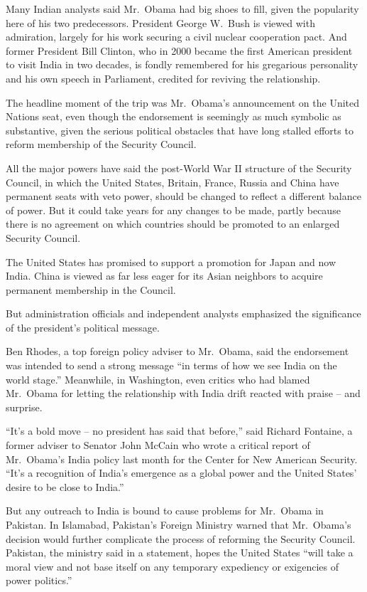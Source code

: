 ﻿\documentclass[12pt]{article}
\begin{document}
Many Indian analysts said Mr.~Obama had big shoes to fill, given the popularity here of his two
predecessors. President George W.~Bush is viewed with admiration, largely for his work securing a
civil nuclear cooperation pact. And former President Bill Clinton, who in 2000 became the first
American president to visit India in two decades, is fondly remembered for his gregarious
personality and his own speech in Parliament, credited for reviving the relationship.

The headline moment of the trip was Mr.~Obama's announcement on the United Nations seat, even though
the endorsement is seemingly as much symbolic as substantive, given the serious political obstacles
that have long stalled efforts to reform membership of the Security Council.

All the major powers have said the post-World War II structure of the Security Council, in which the
United States, Britain, France, Russia and China have permanent seats with veto power, should be
changed to reflect a different balance of power. But it could take years for any changes to be made,
partly because there is no agreement on which countries should be promoted to an enlarged Security
Council.

The United States has promised to support a promotion for Japan and now India. China is viewed as
far less eager for its Asian neighbors to acquire permanent membership in the Council.

But administration officials and independent analysts emphasized the significance of the president's
political message.

Ben Rhodes, a top foreign policy adviser to Mr.~Obama, said the endorsement was intended to send a
strong message ``in terms of how we see India on the world stage.'' Meanwhile, in Washington, even
critics who had blamed Mr.~Obama for letting the relationship with India drift reacted with praise
-- and surprise.

``It's a bold move -- no president has said that before,'' said Richard Fontaine, a former adviser
to Senator John McCain who wrote a critical report of Mr.~Obama's India policy last month for the
Center for New American Security. ``It's a recognition of India's emergence as a global power and
the United States' desire to be close to India.''

But any outreach to India is bound to cause problems for Mr.~Obama in Pakistan. In Islamabad,
Pakistan's Foreign Ministry warned that Mr.~Obama's decision would further complicate the process of
reforming the Security Council. Pakistan, the ministry said in a statement, hopes the United States
``will take a moral view and not base itself on any temporary expediency or exigencies of power
politics.''
\end{document}
